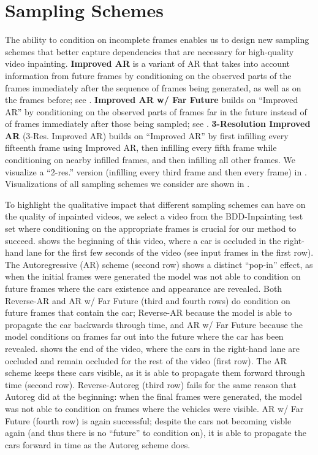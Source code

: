 \section{Sampling Schemes}\label{sec:samplingschemes}
The ability to condition on incomplete frames enables us to design new sampling schemes that better capture dependencies that are necessary for high-quality video inpainting. \textbf{Improved AR} is a variant of AR that takes into account information from future frames by conditioning on the observed parts of the frames immediately after the sequence of frames being generated, as well as on the frames before; see . \textbf{Improved AR w/ Far Future} builds on ``Improved AR'' by conditioning on the observed parts of frames far in the future instead of of frames immediately after those being sampled; see .
\textbf{3-Resolution Improved AR} (3-Res. Improved AR) builds on ``Improved AR'' by first infilling every fifteenth frame using Improved AR, then infilling every fifth frame while conditioning on nearby infilled frames, and then infilling all other frames. We visualize a ``2-res.'' version (infilling every third frame and then every frame) in . Visualizations of all sampling schemes we consider are shown in . 

To highlight the qualitative impact that different sampling schemes can have on the quality of inpainted videos, we select a video from the BDD-Inpainting test set where conditioning on the appropriate frames is crucial for our method to succeed.  shows the beginning of this video, where a car is occluded in the right-hand lane for the first few seconds of the video (see input frames in the first row). The Autoregressive (AR) scheme (second row) shows a distinct ``pop-in'' effect, as when the initial frames were generated the model was not able to condition on future frames where the cars existence and appearance are revealed. Both Reverse-AR and AR w/ Far Future (third and fourth rows) do condition on future frames that contain the car; Reverse-AR because the model is able to propagate the car backwards through time, and AR w/ Far Future because the model conditions on frames far out into the future where the car has been revealed.  shows the end of the video, where the cars in the right-hand lane are occluded and remain occluded for the rest of the video (first row). The AR scheme keeps these cars visible, as it is able to propagate them forward through time (second row). Reverse-Autoreg (third row) fails for the same reason that Autoreg did at the beginning: when the final frames were generated, the model was not able to condition on frames where the vehicles were visible. AR w/ Far Future (fourth row) is again successful; despite the cars not becoming visble again (and thus there is no ``future'' to condition on), it is able to propagate the cars forward in time as the Autoreg scheme does. 

